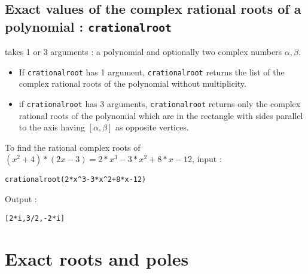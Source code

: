 \documentclass[a4paper,11pt]{book}
\begin{document}
\subsection{Exact values of the complex rational roots of a polynomial : {\tt crationalroot}}
 takes 1 or 3 arguments : a polynomial and  
optionally two complex numbers $\alpha,\beta$.
\begin{itemize}
\item If {\tt crationalroot} has 1 argument, {\tt crationalroot} returns the 
list of the complex rational roots of the 
polynomial without multiplicity.
\item if {\tt crationalroot} has 3 arguments, {\tt crationalroot} returns only
the complex rational roots of the 
polynomial which are in the rectangle with sides parallel to the 
axis having $[\alpha,\beta]$ as opposite vertices.
\end{itemize}
To find the rational complex roots of 
$(x^2+4)*(2x-3)=2*x^3-3*x^2+8*x-12$, input :
\begin{center}{\tt crationalroot(2*x\verb|^|3-3*x\verb|^|2+8*x-12)}\end{center}
Output :
\begin{center}{\tt [2*i,3/2,-2*i]}\end{center} 

\section{Exact roots and poles}
\end{document}
